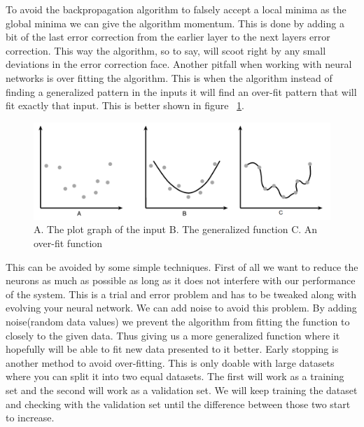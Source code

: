 To avoid the backpropagation algorithm to falsely accept a local minima as the global minima we can give the algorithm momentum. This is done by adding a bit of the last error correction from the earlier layer to the next layers error correction. This way the algorithm, so to say, will scoot right by any small deviations in the error correction face.
\newline
Another pitfall when working with neural networks is over fitting the algorithm. This is when the algorithm instead of finding a generalized pattern in the inputs it will find an over-fit pattern that will fit exactly that input. This is better shown in figure ~\ref{fig:overfitting}.
\begin{figure}[h!]
\centering
\includegraphics[width=0.8\linewidth,natwidth=1262,natheight=415]{billeder/overfitting.png}
\caption{A. The plot graph of the input B. The generalized function C. An over-fit function \cite[P. 319]{buckland2002ai}}
\label{fig:overfitting}
\end{figure}
This can be avoided by some simple techniques. First of all we want to reduce the neurons as much as possible as long as it does not interfere with our performance of the system. This is a trial and error problem and has to be tweaked along with evolving your neural network. We can add noise to avoid this problem. By adding noise(random data values) we prevent the algorithm from fitting the function to closely to the given data. Thus giving us a more generalized function where it hopefully will be able to fit new data presented to it better. Early stopping is another method to avoid over-fitting. This is only doable with large datasets where you can split it into two equal datasets. The first will work as a training set and the second will work as a validation set. We will keep training the dataset and checking with the validation set until the difference between those two start to increase.

